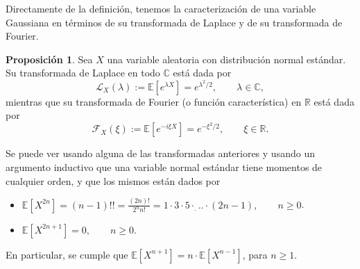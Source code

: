 \documentclass[letterpaper,twoside,12pt]{book}
\newcommand{\R}{\mathbb{R}}
\newcommand{\C}{\mathbb{C}}
\newcommand{\E}{\mathbb{E}}
\newcommand{\1}{\mathds{1}}
\theoremstyle{definition}
\theoremstyle{definition}
\theoremstyle{remark}
\theoremstyle{definition}
\theoremstyle{definition}
\newtheorem{prop}{Proposición}
\theoremstyle{definition}
\theoremstyle{definition}
\theoremstyle{definition}
\begin{document}
Directamente de la definición, tenemos la caracterización de una variable Gaussiana en términos de su transformada de Laplace y de su transformada de Fourier.
\begin{prop}\label{definiciongaussiana}
 Sea $X$ una variable aleatoria con distribución normal estándar. Su transformada de Laplace en todo $\C$ está dada por 
 \[
 \mathcal{L}_X(\lambda):=\E\left[e^{\lambda X}\right]=e^{\lambda^2/2}, \qquad \lambda\in \C,
 \]
mientras que su transformada de Fourier (o función característica) en $\R$ está dada por 
\[
\mathcal{F}_X(\xi):=\E\left[e^{-i\xi X}\right]=e^{-\xi^2/2}, \qquad \xi \in \R. 
\]
 \end{prop}
Se puede ver usando alguna de las transformadas anteriores y usando un argumento inductivo que una variable normal estándar tiene momentos de cualquier orden, y que los mismos están dados por 
 \begin{itemize}
   \item $\E\left[X^{2n}\right]=(n-1)!!=\frac{(2n)!}{2^nn!}=1\cdot3\cdot5\cdot_...\cdot (2n-1), \qquad n\geq0$.
   \item $\E\left[X^{2n+1}\right]=0, \qquad n\geq0$.
 \end{itemize}
 En particular, se cumple que $\E\left[X^{n+1}\right]=n\cdot \E\left[X^{n-1}\right]$, para $n\geq1$.
\end{document}
